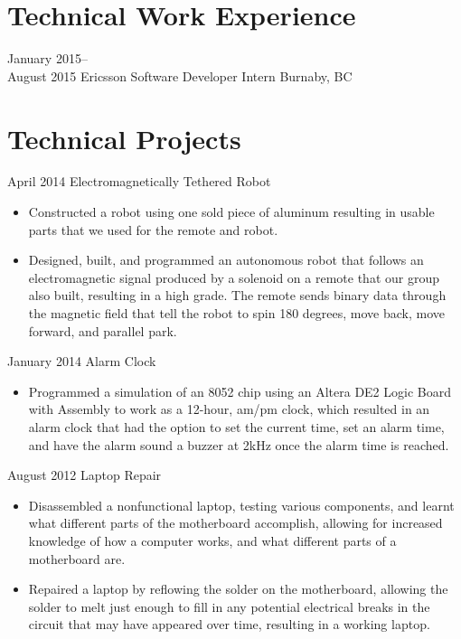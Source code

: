 \documentclass[]{friggeri-cv} %
\begin{document}
\section{Technical Work Experience}

\begin{entrylist}

\entry
{January 2015--\\August 2015}
{Ericsson {\normalfont Software Developer Intern}}
{Burnaby, BC}
{}
\end{entrylist}

\section{Technical Projects}

\begin{entrylist}

\entry
{April 2014}
{Electromagnetically Tethered Robot}
{}
{
\begin{itemize}
\item Constructed a robot using one sold piece of aluminum resulting in usable parts
that we used for the remote and
robot.
\item Designed, built, and programmed an autonomous robot that follows an
electromagnetic signal produced by a
solenoid on a remote that our group also built, resulting in a high grade. The
remote sends binary data through
the magnetic field that tell the robot to spin 180 degrees, move back, move
forward, and parallel park.
\end{itemize}
}
\entry
{January 2014}
{Alarm Clock}
{}
{
\begin{itemize}
\item Programmed a simulation of an 8052 chip using an Altera DE2 Logic Board with
Assembly to work as a 12-hour,
am/pm clock, which resulted in an alarm clock that had the option to set the
current time, set an alarm time, and
have the alarm sound a buzzer at 2kHz once the alarm time is reached.
\end{itemize}
}
\entry
{August 2012}
{Laptop Repair}
{}
{
\begin{itemize}
\item Disassembled a nonfunctional laptop, testing various components, and learnt what
different parts of the
motherboard accomplish, allowing for increased knowledge of how a computer
works, and what different parts of
a motherboard are.
\item Repaired a laptop by reflowing the solder on the motherboard, allowing the
solder to melt just enough to fill in
any potential electrical breaks in the circuit that may have appeared over time,
resulting in a working laptop.
\end{itemize}
}
\end{entrylist}
\end{document}
